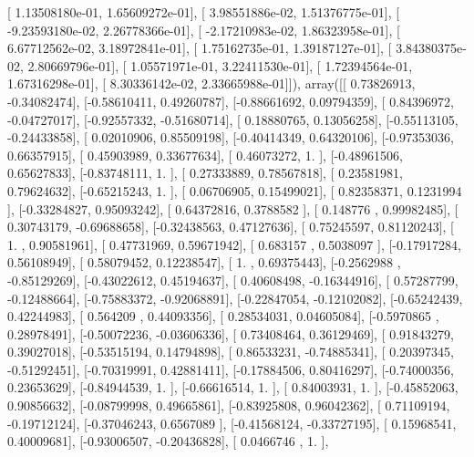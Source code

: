 \documentclass{article}
\begin{document}
       [  1.13508180e-01,   1.65609272e-01],
       [  3.98551886e-02,   1.51376775e-01],
       [ -9.23593180e-02,   2.26778366e-01],
       [ -2.17210983e-02,   1.86323958e-01],
       [  6.67712562e-02,   3.18972841e-01],
       [  1.75162735e-01,   1.39187127e-01],
       [  3.84380375e-02,   2.80669796e-01],
       [  1.05571971e-01,   3.22411530e-01],
       [  1.72394564e-01,   1.67316298e-01],
       [  8.30336142e-02,   2.33665988e-01]]), array([[ 0.73826913, -0.34082474],
       [-0.58610411,  0.49260787],
       [-0.88661692,  0.09794359],
       [ 0.84396972, -0.04727017],
       [-0.92557332, -0.51680714],
       [ 0.18880765,  0.13056258],
       [-0.55113105, -0.24433858],
       [ 0.02010906,  0.85509198],
       [-0.40414349,  0.64320106],
       [-0.97353036,  0.66357915],
       [ 0.45903989,  0.33677634],
       [ 0.46073272,  1.        ],
       [-0.48961506,  0.65627833],
       [-0.83748111,  1.        ],
       [ 0.27333889,  0.78567818],
       [ 0.23581981,  0.79624632],
       [-0.65215243,  1.        ],
       [ 0.06706905,  0.15499021],
       [ 0.82358371,  0.1231994 ],
       [-0.33284827,  0.95093242],
       [ 0.64372816,  0.3788582 ],
       [ 0.148776  ,  0.99982485],
       [ 0.30743179, -0.69688658],
       [-0.32438563,  0.47127636],
       [ 0.75245597,  0.81120243],
       [ 1.        ,  0.90581961],
       [ 0.47731969,  0.59671942],
       [ 0.683157  ,  0.5038097 ],
       [-0.17917284,  0.56108949],
       [ 0.58079452,  0.12238547],
       [ 1.        ,  0.69375443],
       [-0.2562988 , -0.85129269],
       [-0.43022612,  0.45194637],
       [ 0.40608498, -0.16344916],
       [ 0.57287799, -0.12488664],
       [-0.75883372, -0.92068891],
       [-0.22847054, -0.12102082],
       [-0.65242439,  0.42244983],
       [ 0.564209  ,  0.44093356],
       [ 0.28534031,  0.04605084],
       [-0.5970865 ,  0.28978491],
       [-0.50072236, -0.03606336],
       [ 0.73408464,  0.36129469],
       [ 0.91843279,  0.39027018],
       [-0.53515194,  0.14794898],
       [ 0.86533231, -0.74885341],
       [ 0.20397345, -0.51292451],
       [-0.70319991,  0.42881411],
       [-0.17884506,  0.80416297],
       [-0.74000356,  0.23653629],
       [-0.84944539,  1.        ],
       [-0.66616514,  1.        ],
       [ 0.84003931,  1.        ],
       [-0.45852063,  0.90856632],
       [-0.08799998,  0.49665861],
       [-0.83925808,  0.96042362],
       [ 0.71109194, -0.19712124],
       [-0.37046243,  0.6567089 ],
       [-0.41568124, -0.33727195],
       [ 0.15968541,  0.40009681],
       [-0.93006507, -0.20436828],
       [ 0.0466746 ,  1.        ],
\end{document}
